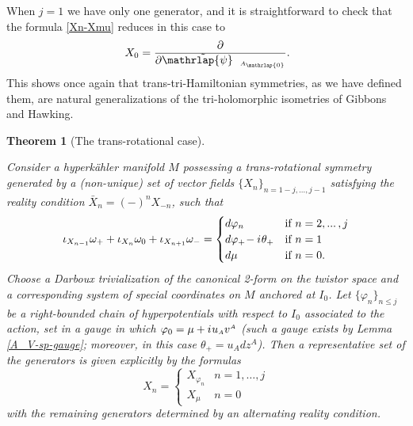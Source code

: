 \documentclass[11pt]{amsart}
\newtheorem{theorem}{Theorem}%
\theoremstyle{remark}
\theoremstyle{remark}
\theoremstyle{definition}
\theoremstyle{definition}
\theoremstyle{definition}
\newcommand{\0}{{\scriptstyle 0'}} %
\newcommand{\1}{{\scriptstyle 1'}}
\newcommand{\A}{{\scriptscriptstyle A}} %
\newcommand{\hp}{\hspace{0.5pt}} %
\newcommand{\psitilde}{\raisebox{0.3pt}{\smash{$\tilde{\smash{\mathrlap{\psi}} \vphantom{\rule[6.5pt]{0pt}{0pt}} \hphantom{\hspace{10.5pt}}}$}} \hspace{-4.1pt}}
\begin{document}
\noindent When $j=1$ we have only one generator, and it is straightforward to check that the formula \eqref{Xn-Xmu} reduces in this case to
\begin{equation}
X_0 = \frac{\partial}{\partial \psitilde_{\A_{\mathrlap{0}}}} \rlap{.}
\end{equation}
This shows once again that trans-tri-Hamiltonian symmetries, as we have defined them, are natural generalizations of the tri-holomorphic isometries of Gibbons and Hawking.


\begin{theorem}[The trans-rotational case] \label{t-rot_grad}

Consider a hyperk\"ahler manifold $M$ possessing a trans-rotational symmetry generated by a (non-unique) set of vector fields $\{X_n\}_{n=1-j,\dots,j-1}$ satisfying the reality condition $\bar{X}_n = (-)^n X_{-n}$, such that
\begin{equation} \label{tr-rot-mom-maps}
\iota_{X_{n-1}}\omega_+ + \iota_{X_{n}}\omega_0 + \iota_{X_{n+1}}\omega_- =
\begin{cases}
d\varphi_n & \text{if $n = 2,...\, , j$} \\
d\varphi_+ \!- i \hp \theta_+ & \text{if $n = 1$} \\
d\mu & \text{if $n=0$} \rlap{.}
\end{cases}
\end{equation}
Choose a Darboux trivialization of the canonical 2-form on the twistor space and a corresponding system of special coordinates on $M$ anchored at $I_0$. Let $\{\varphi_n\}_{n \leq j}$ be a right-bounded chain of hyperpotentials with respect to $I_0$ associated to the action, set in a gauge in which \mbox{$\varphi_0 = \mu + i \hp u_{\A} v^{\A}$} (such a gauge exists by Lemma \ref{A_V-sp-gauge}; moreover, in this case $\theta_+ = u_{\A} dz^{\A}$). Then a representative set of the generators is given explicitly by the formulas
\begin{equation} \label{X_n-sg}
X_n = 
\begin{cases}
X_{\varphi_n} & n = 1, \dots, j \\[1pt]
X_{\mu} & n=0
\end{cases}
\end{equation}
with the remaining generators determined by an alternating reality condition. 

\end{theorem}
\end{document}
